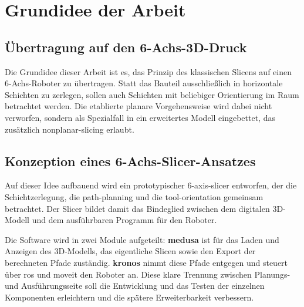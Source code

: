     \section{Grundidee der Arbeit}\label{sec:core-idea}
        \subsection{Übertragung auf den 6-Achs-3D-Druck}\label{subsec:transfer-to-6-axis-3d-printing}
            Die Grundidee dieser Arbeit ist es, das Prinzip des klassischen Slicens auf einen 6-Achs-Roboter zu übertragen.
            Statt das Bauteil ausschließlich in horizontale Schichten zu zerlegen, sollen auch Schichten mit beliebiger Orientierung im Raum betrachtet werden.
            Die etablierte planare Vorgehensweise wird dabei nicht verworfen, sondern als Spezialfall in ein erweitertes Modell eingebettet, das zusätzlich \gls{nonplanar-slicing} erlaubt.

        \subsection{Konzeption eines 6-Achs-Slicer-Ansatzes}\label{subsec:concept-6-axis-slicer-approach}
            Auf dieser Idee aufbauend wird ein prototypischer \gls{6-axis-slicer} entworfen, der die Schichtzerlegung, die \gls{path-planning} und die \gls{tool-orientation} gemeinsam betrachtet.
            Der Slicer bildet damit das Bindeglied zwischen dem digitalen 3D-Modell und dem ausführbaren Programm für den Roboter.

            Die Software wird in zwei Module aufgeteilt:
            \textbf{\ac{medusa}} ist für das Laden und Anzeigen des 3D-Modells, das eigentliche Slicen sowie den Export der berechneten Pfade zuständig.
            \textbf{\ac{kronos}} nimmt diese Pfade entgegen und steuert über \ac{ros} und \ac{moveit} den Roboter an.
            Diese klare Trennung zwischen Planungs- und Ausführungsseite soll die Entwicklung und das Testen der einzelnen Komponenten erleichtern und die spätere Erweiterbarkeit verbessern.

